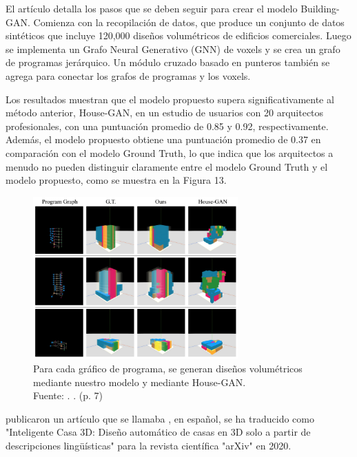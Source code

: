 El artículo detalla los pasos que se deben seguir para crear el modelo Building-GAN. Comienza con la recopilación de datos, que produce un conjunto de datos sintéticos que incluye 120,000 diseños volumétricos de edificios comerciales. Luego se implementa un Grafo Neural Generativo (GNN) de voxels y se crea un grafo de programas jerárquico. Un módulo cruzado basado en punteros también se agrega para conectar los grafos de programas y los voxels.

Los resultados muestran que el modelo propuesto supera significativamente al método anterior, House-GAN, en un estudio de usuarios con 20 arquitectos profesionales, con una puntuación promedio de 0.85 y 0.92, respectivamente. Además, el modelo propuesto obtiene una puntuación promedio de 0.37 en comparación con el modelo Ground Truth, lo que indica que los arquitectos a menudo no pueden distinguir claramente entre el modelo Ground Truth y el modelo propuesto, como se muestra en la Figura 13.

\begin{figure}[!ht]
	\begin{center}
		\includegraphics[width=0.7\textwidth]{2/figures/chang2021.png}
		\caption[Para cada gráfico de programa, se generan diseños volumétricos mediante nuestro modelo y mediante House-GAN]{Para cada gráfico de programa, se generan diseños volumétricos mediante nuestro modelo y mediante House-GAN.\\
		Fuente: \cite{pr_chang2021buildinggan}. . (p. 7)}
		\label{2:fig121}
	\end{center}
\end{figure}

\cite{pr_chen2020intelhome3d} publicaron un artículo que se llamaba , en español, se ha traducido como "Inteligente Casa 3D: Diseño automático de casas en 3D solo a partir de descripciones lingüísticas" para la revista científica "arXiv" en 2020.

